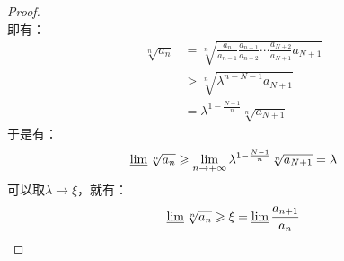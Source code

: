 \begin{proof}
\begin{equation*}
	\end{equation*}	
	即有：
	\begin{align*}
		\sqrt[n]{a_n}&=\sqrt[n]{\frac{a_n}{a_{n-1}}\frac{a_{n-1}}{a_{n-2}}\cdots\frac{a_{N+2}}{a_{N+1}}a_{N+1}} \\
		&>\sqrt[n]{\lambda^{n-N-1}a_{N+1}} \\
		&=\lambda^{1-\frac{N-1}{n}}\sqrt[n]{a_{N+1}}
	\end{align*}
	于是有：
	\begin{equation*}
		\varliminf\sqrt[n]{a_n}\geqslant\lim_{n\to+\infty}\lambda^{1-\frac{N-1}{n}}\sqrt[n]{a_{N+1}}=\lambda
	\end{equation*}
	可以取$\lambda\rightarrow\xi$，就有：
	\begin{equation*}
		\varliminf\sqrt[n]{a_n}\geqslant\xi=\varliminf\frac{a_{n+1}}{a_n}\qedhere
	\end{equation*}
\end{proof}

